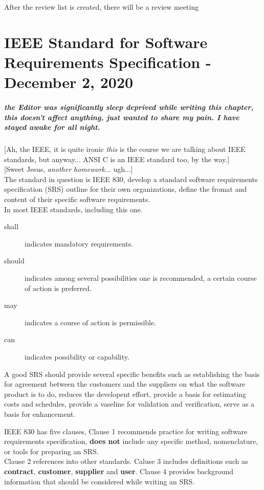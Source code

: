 \documentclass[11pt,a4paper,twocolumn]{book}
\begin{document}
After the review list is created, there will be a review meeting

\chapter{IEEE Standard for Software Requirements Specification - December 2, 2020}

\paragraph{the Editor was significantly sleep deprived while writing this chapter, this doesn't affect anything, just wanted to share my pain. I have stayed awake for all night.}

[Ah, the IEEE, it is quite ironic \textit{this} is the course we are talking about IEEE standards, but anyway... ANSI C is an IEEE standard too, by the way.]\\

[Sweet Jesus, \textit{another homework}... ugh...]\\

The standard in question is IEEE 830, develop a standard software requirements specification (SRS) outline for their own organizations, define the fromat and content of their specific software requirements.\\

In most IEEE standards, including this one.

\begin{description}
\item[shall] indicates mandatory requirements.
\item[should] indicates among several possibilities one is recommended, a certain course of action is preferred.
\item[may] indicates a course of action is permissible.
\item[can] indicates possibility or capability.
\end{description}

A good SRS should provide several specific benefits such as establishing the basis for agreement between the customers and the suppliers on what the software product is to do, reduces the developent effort, provide a basis for estimating costs and schedules, provide a vaseline for validation and verification, serve as a basis for enhancement.

IEEE 830 has five clauses, Clause 1 recommends practice for writing software requirements specification, \textbf{does not} include any specific method, nomenclature, or tools for preparing an SRS.\\

Clause 2 references into other standards. Caluse 3 includes definitions such as \textbf{contract}, \textbf{customer}, \textbf{supplier} and \textbf{user}. Clause 4 provides background information that should be considered while writing an SRS.
\end{document}
